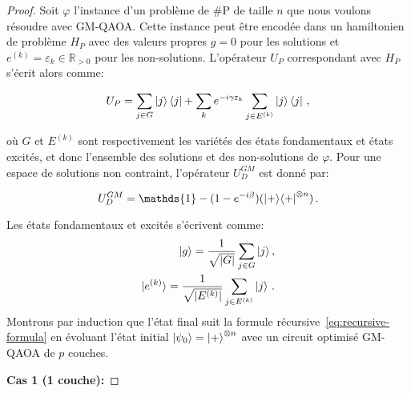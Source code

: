 \begin{proof}
    
Soit $\varphi$ l'instance d'un problème de \textsf{\#P} de taille $n$ que nous voulons résoudre avec GM-QAOA. Cette instance peut être encodée dans un hamiltonien de problème $H_{P}$ avec des valeurs propres $g = 0$ pour les solutions et $e^{(k)} = \varepsilon_{k} \in \mathbb{R}_{>0}$ pour les non-solutions. L'opérateur $U_{P}$ correspondant avec $H_{P}$ s'écrit alors comme:

\begin{equation}
    U_{P} = \sum_{j \in G} \ket{j}\bra{j} + \sum_{k} e^{-i \gamma \varepsilon_{k}} \sum_{j \in E^{(k)}} \ket{j}\bra{j} \,,
\end{equation} 

où $G$ et $E^{(k)}$ sont respectivement les variétés des états fondamentaux et états excités, et donc l'ensemble des solutions et des non-solutions de $\varphi$. Pour une espace de solutions non contraint, l'opérateur $U_{D}^{GM}$ est donné par:

\begin{equation}
    U_{D}^{GM} = \mathds{1} - (1 - e^{-i\beta}) (\ket{+}\!\bra{+}^{\otimes n}) \,.
\end{equation}

Les états fondamentaux et excités s'écrivent comme:
\begin{align}
    \ket{g} = \frac{1}{\sqrt{ \lvert G \rvert }} \sum_{j \in G} \ket{j}, \\
    \ket{e^{(k)}} = \frac{1}{\sqrt{ \lvert E^{(k)} \rvert }} \sum_{j \in E^{(k)}} \ket{j} \,.
\end{align}
Montrons par induction que l'état final suit la formule récursive~\ref{eq:recursive-formula} en évoluant l'état initial $\ket{\psi_{0}} = \ket{+}^{\otimes n}$ avec un circuit optimisé GM-QAOA de $p$ couches. 

\textbf{Cas 1 (1 couche):}


\end{proof}
